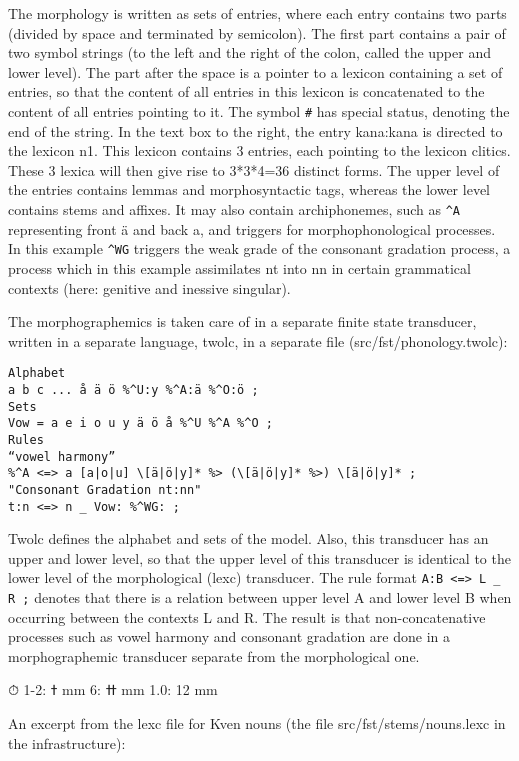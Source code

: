 \documentclass[free]{flammie}
\begin{document}
The morphology is written as sets of entries,
where each entry contains two parts (divided by
space and terminated by semicolon). The first part
contains a pair of two symbol strings (to the left and
the right of the colon, called the upper and lower
level). The part after the space is a pointer to a lexicon containing a set of entries, so that the content of
all entries in this lexicon is concatenated to the content of all entries
pointing to it. The symbol \verb|#| has
special status, denoting the end of the string. In the
text box to the right, the entry kana:kana is directed
to the lexicon n1. This lexicon contains 3 entries,
each pointing to the lexicon clitics. These 3 lexica
will then give rise to 3*3*4=36 distinct forms. The
upper level of the entries contains lemmas and morphosyntactic tags, whereas the lower level contains
stems and affixes. It may also contain archiphonemes, such as \verb|^A| representing front ä and back a, and triggers for morphophonological
processes. In this example \verb|^WG| triggers the weak grade of the consonant gradation process,
a process which in this example assimilates nt into nn in certain grammatical contexts (here:
genitive and inessive singular).

The morphographemics is taken care of in a separate finite state transducer, written in a
separate language, twolc, in a separate file (src/fst/phonology.twolc):

\begin{verbatim}
Alphabet
a b c ... å ä ö %^U:y %^A:ä %^O:ö ;
Sets
Vow = a e i o u y ä ö å %^U %^A %^O ;
Rules
“vowel harmony”
%^A <=> a [a|o|u] \[ä|ö|y]* %> (\[ä|ö|y]* %>) \[ä|ö|y]* ;
"Consonant Gradation nt:nn"
t:n <=> n _ Vow: %^WG: ;
\end{verbatim}

Twolc defines the alphabet and sets of the model. Also, this transducer has an upper and
lower level, so that the upper level of this transducer is identical to the lower level of the
morphological (lexc) transducer. The rule format \verb|A:B <=> L _ R ;| denotes that there is
a relation between upper level A and lower level B when occurring between the contexts L
and R. The result is that non-concatenative processes such as vowel harmony and consonant
gradation are done in a morphographemic transducer separate from the morphological one.

⏱
ߙ :1-2 mm
ߚ :6 mm
1.0: 12 mm

An excerpt from the lexc file
for Kven nouns (the file
src/fst/stems/nouns.lexc
in the infrastructure):
\end{document}
